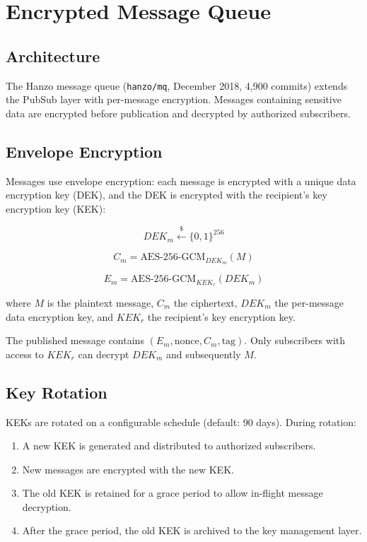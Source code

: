 \documentclass[11pt,a4paper]{article}
\begin{document}
\section{Encrypted Message Queue}

\subsection{Architecture}

The Hanzo message queue (\texttt{hanzo/mq}, December 2018, 4{,}900 commits) extends the PubSub layer with per-message encryption. Messages containing sensitive data are encrypted before publication and decrypted by authorized subscribers.

\subsection{Envelope Encryption}

Messages use envelope encryption: each message is encrypted with a unique data encryption key (DEK), and the DEK is encrypted with the recipient's key encryption key (KEK):

\begin{equation}
    DEK_m \xleftarrow{\$} \{0, 1\}^{256}
\end{equation}

\begin{equation}
    C_m = \text{AES-256-GCM}_{DEK_m}(M)
\end{equation}

\begin{equation}
    E_m = \text{AES-256-GCM}_{KEK_r}(DEK_m)
\end{equation}

where $M$ is the plaintext message, $C_m$ the ciphertext, $DEK_m$ the per-message data encryption key, and $KEK_r$ the recipient's key encryption key.

The published message contains $(E_m, \text{nonce}, C_m, \text{tag})$. Only subscribers with access to $KEK_r$ can decrypt $DEK_m$ and subsequently $M$.

\subsection{Key Rotation}

KEKs are rotated on a configurable schedule (default: 90 days). During rotation:
\begin{enumerate}
    \item A new KEK is generated and distributed to authorized subscribers.
    \item New messages are encrypted with the new KEK.
    \item The old KEK is retained for a grace period to allow in-flight message decryption.
    \item After the grace period, the old KEK is archived to the key management layer.
\end{enumerate}
\end{document}
